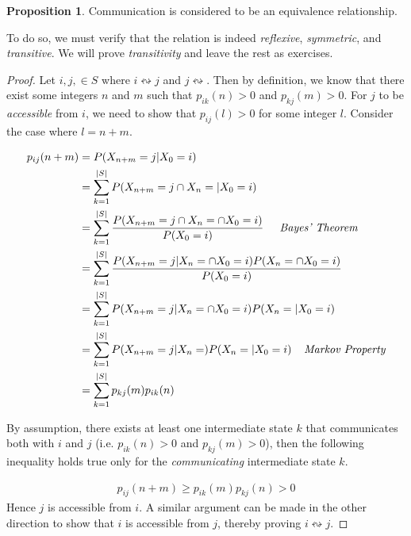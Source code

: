 \documentclass[a4paper,12pt]{article}
\theoremstyle{definition}
\newtheorem{proposition}{Proposition}[subsection]
\begin{document}
	\begin{proposition}
		Communication is considered to be an equivalence relationship.
	\end{proposition}
		To do so, we must verify that the relation is indeed \emph{reflexive}, \emph{symmetric}, and \emph{transitive}. 
		We will prove \emph{transitivity} and leave the rest as exercises. 
		\begin{proof}	
		Let $i, j, \in S$ where $i \leftrightsquigarrow j$ and $j \leftrightsquigarrow$.
		Then by definition, we know that there exist some integers $n$ and $m$ such that 
		$p_{ik}(n) > 0$ and $p_{kj}(m) > 0$. For $j$ to be \emph{accessible} from $i$, we need to show that 
		$p_{ij}(l) > 0$ for some integer $l$. Consider the case where $l = n+m$.

	\begin{equation*}
		\begin{aligned}
			p_{ij}(n+m) &= P(X_{n+m} = j | X_0 = i) \\
						&= \sum_{k=1}^{|S|} P(X_{n+m} = j \cap X_n = | X_0 = i) \\
						&= \sum_{k=1}^{|S|} \frac{P(X_{n+m} = j \cap X_n = \cap X_0 = i)}{P(X_0 = i)}\ \;\;\;\; \emph{Bayes' Theorem} \\
						&= \sum_{k=1}^{|S|} \frac{P(X_{n+m} = j | X_n = \cap X_0 = i)P(X_n = \cap X_0 = i)}{P(X_0 = i)}\ \\
						&= \sum_{k=1}^{|S|} P(X_{n+m} = j | X_n = \cap X_0 = i)P(X_n = | X_0 = i) \\
						&= \sum_{k=1}^{|S|} P(X_{n+m} = j | X_n =)P(X_n = | X_0 = i) \;\;\;\; \emph{Markov Property} \\ 
						&= \sum_{k=1}^{|S|} p_{kj}(m)p_{ik}(n) \\
		\end{aligned}
	\end{equation*}	
	
	By assumption, there exists at least one intermediate state $k$ that communicates both with $i$ and $j$ (i.e. $p_{ik}(n) > 0$ 
	and $p_{kj}(m) > 0$), then the following inequality holds true only for the \emph{communicating} intermediate state $k$.

	\begin{equation*}
	\begin{aligned}
		 p_{ij}(n+m) \geq p_{ik}(m)p_{kj}(n) > 0
	\end{aligned}
	\end{equation*}	
	Hence $j$ is accessible from $i$. A similar argument can be made in the other direction to show that $i$ is accessible from $j$,
	thereby proving $i \leftrightsquigarrow j$.
	\end{proof}
\end{document}
